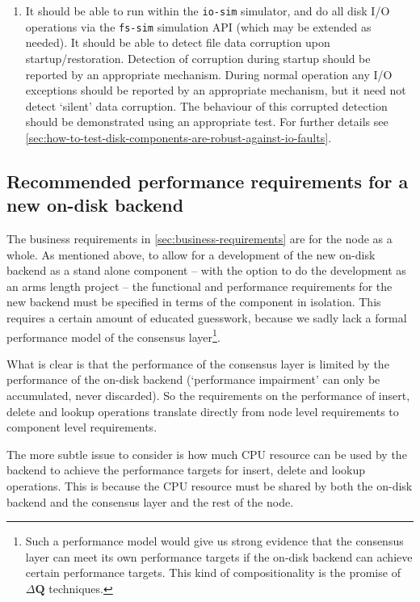 \documentclass[11pt,a4paper]{article}
\begin{document}
\begin{enumerate}
\item It should be able to run within the \texttt{io-sim} simulator, and do all
      disk I/O operations via the \texttt{fs-sim} simulation API (which may be
      extended as needed). It should be able to detect file data corruption
      upon startup/restoration. Detection of corruption during startup should
      be reported by an appropriate mechanism. During normal operation any I/O
      exceptions should be reported by an appropriate mechanism, but it need
      not detect `silent' data corruption.  The behaviour of this corrupted
      detection should be demonstrated using an appropriate test. For further
      details
      see \cref{sec:how-to-test-disk-components-are-robust-against-io-faults}.
\end{enumerate}

\subsection{Recommended performance requirements for a new on-disk backend}

The business requirements in \cref{sec:business-requirements} are for the node
as a whole. As mentioned above, to allow for a development of the new on-disk
backend as a stand alone component -- with the option to do the development as
an arms length project -- the functional and performance requirements for the
new backend must be specified in terms of the component in isolation. This
requires a certain amount of educated guesswork, because we sadly lack a formal
performance model of the consensus layer\footnote{Such a performance model
would give us strong evidence that the consensus layer can meet its own
performance targets if the on-disk backend can achieve certain performance
targets. This kind of compositionality is the promise of $\Delta{}\mathbf{Q}$
techniques.}.

What is clear is that the performance of the consensus layer is limited by the
performance of the on-disk backend (`performance impairment' can only be
accumulated, never discarded). So the requirements on the performance of insert,
delete and lookup operations translate directly from node level requirements to
component level requirements.

The more subtle issue to consider is how much CPU resource can be used by the
backend to achieve the performance targets for insert, delete and lookup
operations. This is because the CPU resource must be shared by both the on-disk
backend and the consensus layer and the rest of the node.
\end{document}
